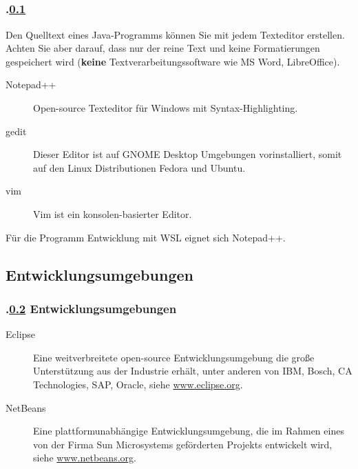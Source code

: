 \subsection{\stitle}\label{S:Editor}
\begin{frame}[t]%
  \frametitle{\kap.\ref{S:Editor} \stitle}%

Den Quelltext eines Java-Programms k\"onnen Sie mit jedem Texteditor erstellen.
Achten Sie aber darauf, dass nur der reine Text und keine Formatierungen gespeichert wird (\textbf{keine} Textverarbeitungssoftware wie MS Word, LibreOffice).
\medskip

\begin{description}
  \item[Notepad++] Open-source Texteditor f\"ur Windows mit Syntax-Highlighting.
\end{description}

\begin{description}
  \item[gedit] Dieser Editor ist auf GNOME Desktop Umgebungen vorinstalliert, somit auf den Linux Distributionen Fedora und Ubuntu.
  \item[vim] Vim ist ein konsolen-basierter Editor.
\end{description}

\vfill
Für die Programm Entwicklung mit WSL eignet sich Notepad++.
\end{frame}


\def\stitle{Entwicklungsumgebungen}%
\subsection{\stitle}\label{S:IDE}
\begin{frame}[t]%
  \frametitle{\kap.\ref{S:IDE} \stitle}%


\begin{description}
  \item[Eclipse] Eine weitverbreitete open-source Entwicklungsumgebung die große Unterstützung aus der Industrie erhält, unter anderen von IBM, Bosch, CA Technologies, SAP, Oracle, siehe \textcolor{KITblue}{\url{www.eclipse.org}}.
  \item[NetBeans] Eine plattformunabh\"angige Entwicklungsumgebung, die im Rahmen eines von der Firma Sun Microsystems gef\"orderten Projekts entwickelt wird, siehe \textcolor{KITblue}{\url{www.netbeans.org}}.
\end{description}
\end{frame}
